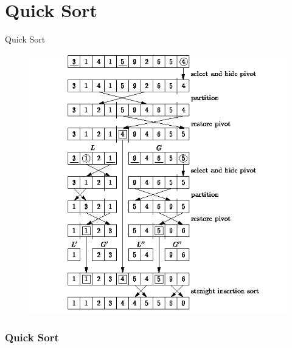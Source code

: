 \documentclass{beamer}
\begin{document}
\section{Quick Sort}
\begin{frame}{Quick Sort}
    \begin{figure}[h]
        \includegraphics[scale=0.4]{quick/quick}
    \end{figure}
\end{frame}
\begin{frame}
    \frametitle{Quick Sort}
    \begin{multicols}{2}
        
        \vfill\null
        \columnbreak
        
    \end{multicols}
\end{frame}
\end{document}
